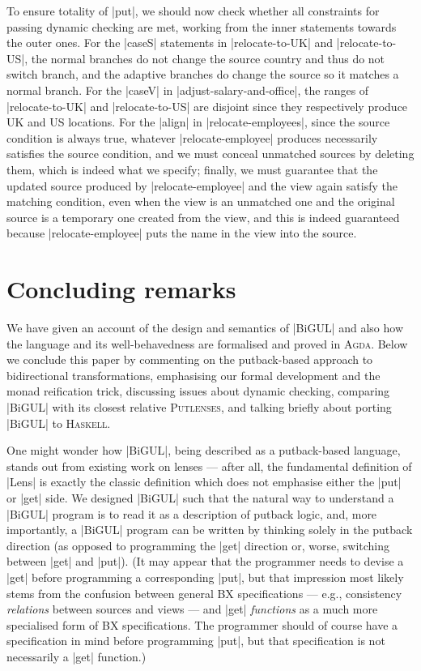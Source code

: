 \documentclass{sigplanconf}
\renewcommand{\emph}{\textsl}
\newcommand{\Putlenses}{\textsc{Putlenses}}
\newcommand{\Agda}{\textsc{Agda}}
\newcommand{\Haskell}{\textsc{Haskell}}
\begin{document}
To ensure totality of |put|, we should now check whether all constraints for passing dynamic checking are met, working from the inner statements towards the outer ones.
For the |caseS| statements in |relocate-to-UK| and |relocate-to-US|, the normal branches do not change the source country and thus do not switch branch, and the adaptive branches do change the source so it matches a normal branch.
For the |caseV| in |adjust-salary-and-office|, the ranges of |relocate-to-UK| and |relocate-to-US| are disjoint since they respectively produce UK and US locations.
For the |align| in |relocate-employees|, since the source condition is always true, whatever |relocate-employee| produces necessarily satisfies the source condition, and we must conceal unmatched sources by deleting them, which is indeed what we specify; finally, we must guarantee that the updated source produced by |relocate-employee| and the view again satisfy the matching condition, even when the view is an unmatched one and the original source is a temporary one created from the view, and this is indeed guaranteed because |relocate-employee| puts the name in the view into the source.


\section{Concluding remarks}
\label{sec:concluding-remarks}

We have given an account of the design and semantics of |BiGUL| and also how the language and its well-behavedness are formalised and proved in \Agda.
Below we conclude this paper by commenting on the putback-based approach to bidirectional transformations, emphasising our formal development and the monad reification trick, discussing issues about dynamic checking, comparing |BiGUL| with its closest relative \Putlenses, and talking briefly about porting |BiGUL| to \Haskell.

One might wonder how |BiGUL|, being described as a putback-based language, stands out from existing work on lenses ---
after all, the fundamental definition of |Lens| is exactly the classic definition which does not emphasise either the |put| or |get| side.
We designed |BiGUL| such that the natural way to understand a |BiGUL| program is to read it as a description of putback logic, and, more importantly, a |BiGUL| program can be written by thinking solely in the putback direction (as opposed to programming the |get| direction or, worse, switching between |get| and |put|).
(It may appear that the programmer needs to devise a |get| before programming a corresponding |put|, but that impression most likely stems from the confusion between general BX specifications --- e.g., consistency \emph{relations} between sources and views --- and |get| \emph{functions} as a much more specialised form of BX specifications.
The programmer should of course have a specification in mind before programming |put|, but that specification is not necessarily a |get| function.)
\end{document}
